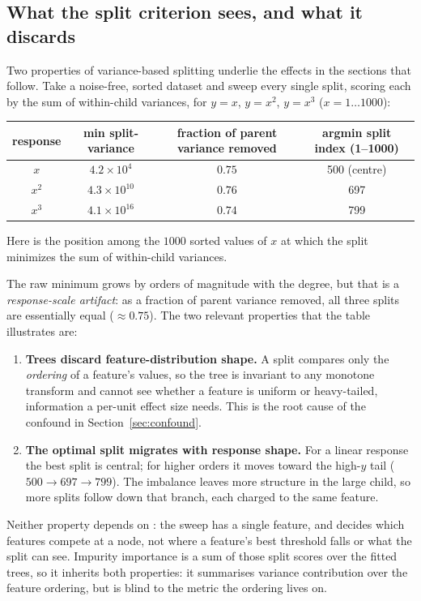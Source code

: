 \subsection{What the split criterion sees, and what it discards}
\label{sec:variance}

Two properties of variance-based splitting underlie the effects in the sections
that follow. Take a
noise-free, sorted dataset and sweep every single split, scoring each by the sum
of within-child variances, for $y = x$, $y = x^2$, $y = x^3$ ($x =
1\ldots1000$):

\begin{center}
\begin{tabular}{cccc}
\toprule
response & min split-variance & fraction of parent variance removed & argmin split index (1--1000) \\
\midrule
$x$   & $4.2 \times 10^{4}$  & $0.75$ & 500 (centre) \\
$x^2$ & $4.3 \times 10^{10}$ & $0.76$ & 697 \\
$x^3$ & $4.1 \times 10^{16}$ & $0.74$ & 799 \\
\bottomrule
\end{tabular}
\end{center}

Here  is the position among the $1000$ sorted values of $x$ at
which the split minimizes the sum of within-child variances.

The raw minimum grows by orders of magnitude with the degree, but that is a
\emph{response-scale artifact}: as a fraction of parent variance removed, all
three splits are essentially equal (${\approx}0.75$). The two relevant
properties that the table illustrates are:

\begin{enumerate}[leftmargin=1.6em]
\item \textbf{Trees discard feature-distribution shape.} A split compares only
the
  \emph{ordering} of a feature's values, so the tree is invariant to any
  monotone
  transform and cannot see whether a feature is uniform or heavy-tailed,
  information a per-unit effect size needs. This is the root cause of the
  confound
  in Section~\ref{sec:confound}.
\item \textbf{The optimal split migrates with response shape.} For a linear
  response the best split is central; for higher orders it moves toward the
  high-$y$ tail ($500 \rightarrow 697 \rightarrow 799$). The imbalance leaves
  more
  structure in the large child, so more splits follow down that branch, each
  charged to the same feature.
\end{enumerate}

Neither property depends on : the sweep has a single feature, and
 decides which features compete at a node, not where a feature's
best threshold falls or what the split can see.
Impurity importance is a sum of those split scores over the fitted trees, so it
inherits both properties: it summarises variance contribution over the feature
ordering, but is blind to the metric the ordering lives on.
